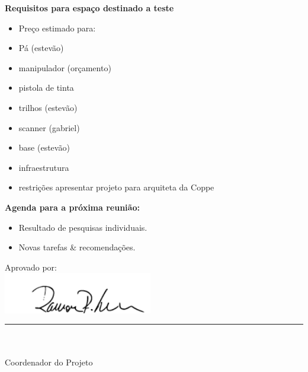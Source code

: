 				
\item \textbf{Requisitos para espaço destinado a teste}
			\begin{itemize} 
			    \item Preço estimado para:
			    \item Pá (estevão)
			    \item manipulador (orçamento)
				\item pistola de tinta 
				\item trilhos (estevão)
				\item scanner (gabriel)
				\item base (estevão)
				\item infraestrutura
   				\item restrições apresentar projeto para arquiteta da Coppe
   			\end{itemize}	




\textbf{Agenda para a próxima reunião:}
  \begin{itemize}
    \item Resultado de pesquisas individuais.
    \item Novas tarefas \& recomendações.
  \end{itemize}


\vspace{5mm}%
\parbox[t]{70mm}{
  Aprovado por: \\[5mm]
  \centering
  \includegraphics[width=65mm]{figs/logo/assinatura-ramon.png} \\[-4mm]
  \rule[2mm]{70mm}{0.1mm} \\
  \ramon \\[1mm]
  Coordenador do Projeto \\
}

\fim
